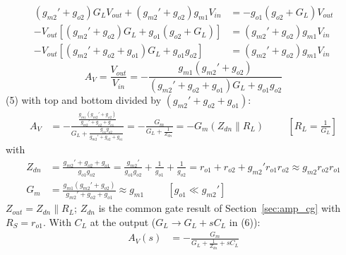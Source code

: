 \begin{enumerate}
\begin{align*}
      (g_{m2}' + g_{o2}) G_L V_{out} + (g_{m2}' + g_{o2}) g_{m1} V_{in} &= -g_{o1}(g_{o2} + G_L) V_{out} \\
      -V_{out}\left[(g_{m2}' + g_{o2}) G_L + g_{o1}(g_{o2} + G_L)\right] &= (g_{m2}' + g_{o2}) g_{m1} V_{in} \\
      -V_{out}\left[(g_{m2}' + g_{o2} + g_{o1}) G_L + g_{o1} g_{o2}\right] &= (g_{m2}' + g_{o2}) g_{m1} V_{in}
    \end{align*}
    \[
      A_V = \frac{V_{out}}{V_{in}} = -\frac{g_{m1}(g_{m2}' + g_{o2})}{(g_{m2}' + g_{o2} + g_{o1}) G_L + g_{o1} g_{o2}} \tag{5}
    \]
    (5) with top and bottom divided by \((g_{m2}' + g_{o2} + g_{o1})\):
    \begin{align*}
      A_V &= -\frac{\frac{g_{m1}(g_{m2}' + g_{o2})}{g_{m2}' + g_{o2} + g_{o1}}}{G_L + \frac{g_{o1} g_{o2}}{g_{m2}' + g_{o2} + g_{o1}}} = -\frac{G_m}{G_L + \frac{1}{Z_{dn}}} = -G_m (Z_{dn} \parallel R_L) \hspace{1cm} \left[R_L = \tfrac{1}{G_L}\right] \tag{6}
    \end{align*}
    with
    \begin{align*}
      Z_{dn} &= \frac{g_{m2}' + g_{o2} + g_{o1}}{g_{o1} g_{o2}} = \frac{g_{m2}'}{g_{o1} g_{o2}} + \frac{1}{g_{o1}} + \frac{1}{g_{o2}} = r_{o1} + r_{o2} + g_{m2}' r_{o1} r_{o2} \approx g_{m2} r_{o2} r_{o1} \\
      G_m &= \frac{g_{m1}(g_{m2}' + g_{o2})}{g_{m2}' + g_{o2} + g_{o1}} \approx g_{m1} \hspace{1cm} [g_{o1} \ll g_{m2}']
    \end{align*}
    \(Z_{out} = Z_{dn} \parallel R_L\); \(Z_{dn}\) is the common gate result of Section~\ref{sec:amp_cg} with
    \(R_S = r_{o1}\). With \(C_L\) at the output (\(G_L \to G_L + sC_L\) in (6)):
    \begin{align*}
      A_V(s) &= -\frac{G_m}{G_L + \frac{1}{Z_{dn}} + sC_L} \tag{7}
    \end{align*}
\end{enumerate}

